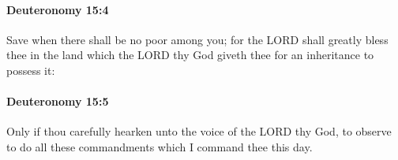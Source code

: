 		\paragraph{Deuteronomy 15:4} %
			\label{DEUTERONOMY-15-4}

			Save when there shall be no poor among you; for the LORD shall greatly bless thee in the land which the LORD thy God giveth thee for an inheritance to possess it:


		\paragraph{Deuteronomy 15:5} %
			\label{DEUTERONOMY-15-5}

			Only if thou carefully hearken unto the voice of the LORD thy God, to observe to do all these commandments which I command thee this day.


